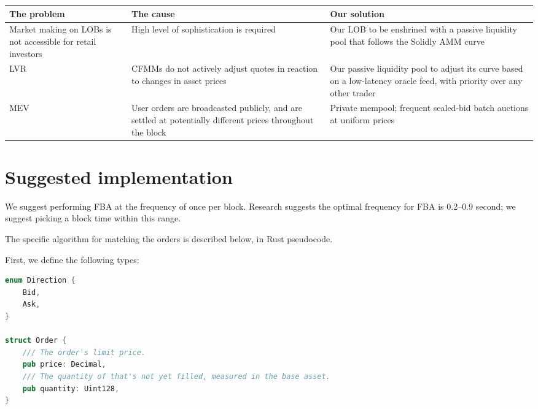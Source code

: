 \documentclass{article}
\begin{document}
\tabulinesep=3mm
\begin{tabu} to \textwidth {YYY}
  \toprule
  \textbf{The problem}                                                                                       & \textbf{The cause} & \textbf{Our solution} \\
  \midrule
  Market making on LOBs is not accessible for retail investors                                               &
  High level of sophistication is required                                                                   &
  Our LOB to be enshrined with a passive liquidity pool that follows the Solidly AMM curve                                                                \\
  \hline
  LVR                                                                                                        &
  CFMMs do not actively adjust quotes in reaction to changes in asset prices                                 &
  Our passive liquidity pool to adjust its curve based on a low-latency oracle feed, with priority over any other trader                                  \\
  \hline
  MEV                                                                                                        &
  User orders are broadcasted publicly, and are settled at potentially different prices throughout the block &
  Private mempool; frequent sealed-bid batch auctions at uniform prices                                                                                   \\
  \bottomrule
\end{tabu}

\pagebreak
\appendix
\section{Suggested implementation}
\label{sec:appendixa}

We suggest performing FBA at the frequency of once per block. Research suggests the optimal frequency for FBA is 0.2--0.9 second;\supercite{optimalspeed} we suggest picking a block time within this range.

The specific algorithm for matching the orders is described below, in Rust pseudocode.

First, we define the following types:

\begin{lstlisting}[language=rust]
enum Direction {
    Bid,
    Ask,
}

struct Order {
    /// The order's limit price.
    pub price: Decimal,
    /// The quantity of that's not yet filled, measured in the base asset.
    pub quantity: Uint128,
}
\end{lstlisting}
\end{document}
